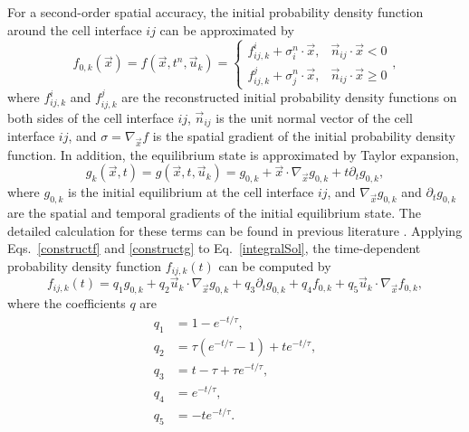 \documentclass[3p,12pt]{elsarticle}
\begin{document}
	For a second-order spatial accuracy, the initial probability density function around the cell interface $ij$ can be approximated by
	\begin{equation}
		f_{0,k}\left(\vec{x}\right) = f\left( \vec{x}, t^n, \vec{u}_k\right) =\left\{\begin{array}{ll}f_{i j, k}^{i}+\sigma _{i}^{n} \cdot \vec{x}, & \vec{n}_{i j} \cdot \vec{x}<0 \\ f_{i j, k}^{j}+\sigma _{j}^{n} \cdot \vec{x}, & \vec{n}_{i j} \cdot \vec{x} \geq 0\end{array}\right. ,
		\label{constructf}\end{equation}
	where $f_{ij,k}^{i}$ and $f_{ij,k}^{j}$ are the reconstructed initial probability density functions on both sides of the cell interface $ij$, $\vec{n}_{ij}$ is the unit normal vector of the cell interface $ij$, and $\sigma =\nabla_{\vec{x}}{f}$ is the spatial gradient of the initial probability density function. In addition, the equilibrium state is approximated by Taylor expansion,
	\begin{equation}
		g_{k}\left(\vec{x},t\right) = g\left(\vec{x},t, \vec{u}_k \right) = g_{0,k} +  \vec{x} \cdot \nabla_{\vec{x}}g_{0,k}  + t \partial_t g_{0,k},
		\label{constructg}\end{equation}
	where $g_{0,k}$ is the initial equilibrium at the cell interface $ij$, and $ \nabla_{\vec{x}}g_{0,k}$ and $\partial_t g_{0,k}$ are the spatial and temporal gradients of the initial equilibrium state. The detailed calculation for these terms can be found in previous literature \cite{xu2010unified}.
	Applying Eqs.~\eqref{constructf} and \eqref{constructg} to Eq.~\eqref{integralSol}, the time-dependent probability density function $f_{ij,k}(t)$ can be computed by
	\begin{equation}
		f_{ij,k}(t) = q_1 g_{0,k} + q_2 \vec{u}_k \cdot \nabla_{\vec{x}}g_{0,k} + q_3 \partial _t g_{0,k} + q_4 f_{0,k} + q_5  \vec{u}_k \cdot \nabla_{\vec{x}}f_{0,k},
		\label{fij}\end{equation}
	where the coefficients $q$ are
	\begin{equation}
		\begin{aligned}
			q_1 &= 1 - e^{-t / \tau}, \\
			q_2 &= \tau \left( e^{-t/\tau} - 1\right) + te^{-t/\tau} ,\\
			q_3 &= t - \tau + \tau e^{-t /\tau}  ,\\
			q_4 &= e^{-t / \tau},\\
			q_5 &= - te^{-t/ \tau}.
		\end{aligned}
	\end{equation}
\end{document}
